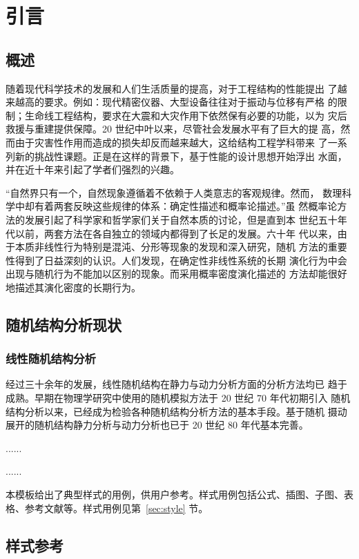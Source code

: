\chapter{引言}

\section{概述}

随着现代科学技术的发展和人们生活质量的提高，对于工程结构的性能提出
了越来越高的要求。例如：现代精密仪器、大型设备往往对于振动与位移有严格
的限制；生命线工程结构，要求在大震和大灾作用下依然保有必要的功能，以为
灾后救援与重建提供保障。20 世纪中叶以来，尽管社会发展水平有了巨大的提
高，然而由于灾害性作用而造成的损失却反而越来越大，这给结构工程学科带来
了一系列新的挑战性课题。正是在这样的背景下，基于性能的设计思想开始浮出
水面，并在近十年来引起了学者们强烈的兴趣\cite{chen2021}。


``自然界只有一个，自然现象遵循着不依赖于人类意志的客观规律。然而，
数理科学中却有着两套反映这些规律的体系：确定性描述和概率论描述。''虽
然概率论方法的发展引起了科学家和哲学家们关于自然本质的讨论，但是直到本
世纪五十年代以前，两套方法在各自独立的领域内都得到了长足的发展。六十年
代以来，由于本质非线性行为特别是混沌、分形等现象的发现和深入研究，随机
方法的重要性得到了日益深刻的认识。人们发现，在确定性非线性系统的长期
演化行为中会出现与随机行为不能加以区别的现象。而采用概率密度演化描述的
方法却能很好地描述其演化密度的长期行为\cite{chen2021,soave2020}。

\section{随机结构分析现状}

\subsection{线性随机结构分析}

经过三十余年的发展，线性随机结构在静力与动力分析方面的分析方法均已
趋于成熟。早期在物理学研究中使用的随机模拟方法于 20 世纪 70 年代初期引入
随机结构分析以来，已经成为检验各种随机结构分析方法的基本手段。基于随机
摄动展开的随机结构静力分析与动力分析也已于 20 世纪 80 年代基本完善。

......

......


本模板给出了典型样式的用例，供用户参考。样式用例包括公式、插图、子图、表格、参考文献等。样式用例见第~\ref{sec:style} 节。

\section{样式参考\label{sec:style}}
